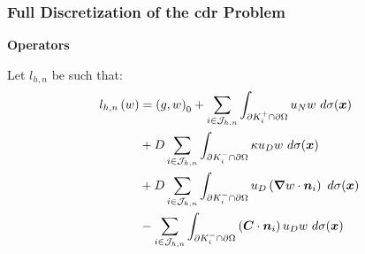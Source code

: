 \begin{frame}
    \frametitle{Full Discretization of the \acrshort{cdr} Problem}

    \vspace*{\fill}
    \begin{center}
        {\color{\accentcolor} \Large \textbf{Operators}}
        \vspace*{0.25cm}

        \begin{minipage}{0.75\textwidth}
            \begin{definition}
                Let $l_{h, n}$ be such that:
                \begin{align*}
                    l_{h, n} \left( w \right)  &= \left( g, w \right)_0 + \sum_{i \in \mathcal{J}_{h, n}} \int_{\partial K_i^+ \cap \partial \Omega} u_N w ~ d \sigma(\bm{x}) \\
                    &+ D \sum_{i \in \mathcal{J}_{h, n}} \int_{\partial K_i^- \cap \partial \Omega} \kappa u_D w ~ d \sigma(\bm{x}) \\
                    &+ D \sum_{i \in \mathcal{J}_{h, n}} \int_{\partial K_i^- \cap \partial \Omega} u_D \left( \bm{\nabla} w \cdot \bm{n}_i \right) ~ d \sigma(\bm{x}) \\
                    &- \sum_{i \in \mathcal{J}_{h, n}} \int_{\partial K_i^- \cap \partial \Omega} \left( \bm{C} \cdot \bm{n}_i \right) u_D w ~ d \sigma(\bm{x})
                \end{align*}
            \end{definition}
        \end{minipage}
    \end{center}
    \vspace*{\fill}
    
\end{frame}